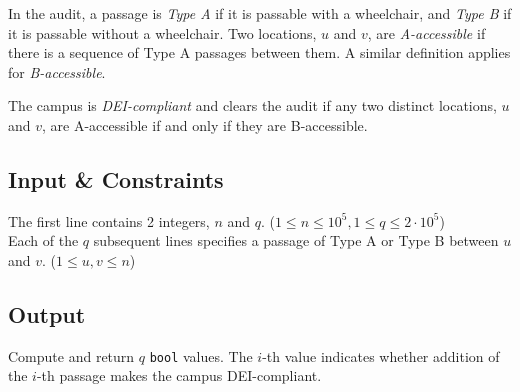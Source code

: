 \documentclass[a4paper]{exam}
\begin{document}
\begin{questions}
  In the audit, a passage is \textit{Type A} if it is passable with a wheelchair, and \textit{Type B} if it is passable without a wheelchair. Two locations, $u$ and $v$, are \textit{A-accessible} if there is a sequence of Type A passages between them. A similar definition applies for \textit{B-accessible}.

  The campus is \textit{DEI-compliant} and clears the audit if any two distinct locations, $u$ and $v$, are A-accessible if and only if they are B-accessible.

  \subsection*{Input \& Constraints}
  The first line contains 2 integers, $n$ and $q$. ($1\leq n \leq 10^5, 1\leq q \leq 2\cdot 10^5$)
  \\
  Each of the $q$ subsequent lines specifies a passage of Type A or Type B between $u$ and $v$. ($1\leq u,v \leq n$)
  
  \subsection*{Output}
  Compute and return $q$ \texttt{bool} values. The $i$-th value indicates whether addition of the $i$-th passage makes the campus DEI-compliant.


\end{questions}
\end{document}

